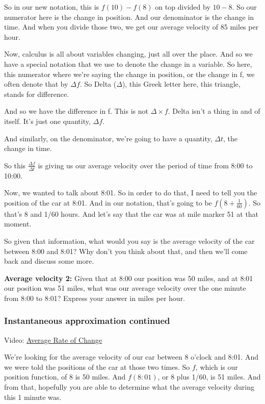\documentclass[pdftex, brazil, 12pt, twoside]{article}
\begin{document}
So in our new notation, this is $f(10) - f(8)$
on top divided by $10 - 8$.
So our numerator here is the change in position.
And our denominator is the change in time.
And when you divide those two, we
get our average velocity of 85 miles per hour.

Now, calculus is all about variables changing, just
all over the place.
And so we have a special notation
that we use to denote the change in a variable.
So here, this numerator where we're
saying the change in position, or the change in f,
we often denote that by $\Delta f$.
So Delta ($\Delta$), this Greek letter here, this triangle,
stands for difference.

And so we have the difference in f.
This is not $\Delta \times f$.
Delta isn't a thing in and of itself.
It's just one quantity, $\Delta f$.

And similarly, on the denominator,
we're going to have a quantity, $\Delta t$, the change in time.

So this $\frac{\Delta f}{\Delta t}$
is giving us our average velocity over the period
of time from 8:00 to 10:00.

Now, we wanted to talk about 8:01.
So in order to do that, I need to tell you the position
of the car at 8:01.
And in our notation, that's going to be $f(8 + \frac{1}{60})$.
So that's 8 and 1/60 hours.
And let's say that the car was at mile marker 51
at that moment.

So given that information, what would you say
is the average velocity of the car between 8:00 and 8:01?
Why don't you think about that, and then
we'll come back and discuss some more.

\begin{exercise}
  \textbf{Average velocity 2:} Given that at 8:00 our position was 50 miles,
  and at 8:01 our position was 51 miles, what was our average velocity over
  the one minute from 8:00 to 8:01? Express your answer in miles per hour. 
\end{exercise}

\subsubsection{Instantaneous approximation continued}
\label{u1-what-inst-cont}

Video: \href{https://www.youtube.com/watch?v=d0OvM9uJ\_GY}{Average Rate of Change}

We're looking for the average velocity of our car
between 8 o'clock and 8:01.
And we were told the positions of the car at those two times.
So $f$, which is our position function, of 8 is 50 miles.
And $f(8:01)$, or 8 plus 1/60, is 51 miles.
And from that, hopefully you are able to determine
what the average velocity during this 1 minute was.
\end{document}
